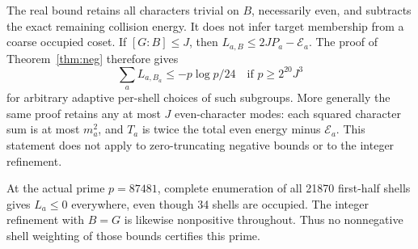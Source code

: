 \documentclass[10pt,reqno]{amsart}
\begin{document}
The real bound retains all characters trivial on $B$, necessarily even, and
subtracts the exact remaining collision energy. It does not infer target
membership from a coarse occupied coset. If $[G:B]\le J$, then
$L_{a,B}\le2JP_a-\mathcal E_a$. The proof of Theorem~\ref{thm:neg} therefore gives
\[
 \boxed{\sum_aL_{a,B_a}\le-p\log p/24
 \quad\text{if }p\ge2^{20}J^3}
\]
for arbitrary adaptive per-shell choices of such subgroups. More generally the
same proof retains any at most $J$ even-character modes: each squared character
sum is at most $m_a^2$, and $T_a$ is twice the total even energy minus
$\mathcal E_a$. This statement does not apply to zero-truncating negative
bounds or to the integer refinement.

At the actual prime $p=87481$, complete enumeration of all 21870 first-half
shells gives $L_a\le0$ everywhere, even though 34 shells are occupied. The
integer refinement with $B=G$ is likewise nonpositive throughout. Thus no
nonnegative shell weighting of those bounds certifies this prime.
\end{document}
